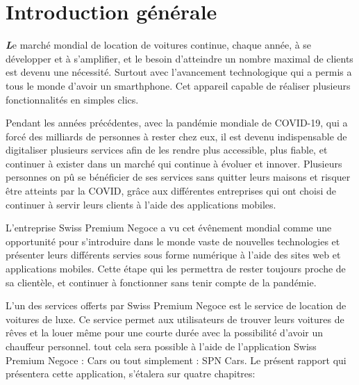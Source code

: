 \thispagestyle{plain}
\section{Introduction générale}
\vspace{1.5cm}
\setlength{\parindent}{40pt}
\justifying
\begin{small}
    \lettrine[findent=2pt]{\textbf{\textit{L}}}{}e marché mondial de location de voitures continue, chaque année, à se développer et à s'amplifier, et le besoin d'atteindre un nombre maximal de clients est devenu une nécessité. Surtout avec l'avancement technologique qui a permis a tous le monde d'avoir un smarthphone. Cet appareil capable de réaliser plusieurs fonctionnalités en simples clics.

    \noindent Pendant les années précédentes, avec la pandémie mondiale de COVID-19, qui a forcé des milliards de personnes à rester chez eux, il est devenu indispensable de digitaliser plusieurs services afin de les rendre plus accessible, plus fiable, et continuer à exister dans un marché qui continue à évoluer et innover. Plusieurs personnes on pû se bénéficier de ses services sans quitter leurs maisons et risquer être atteints par la COVID, grâce aux différentes entreprises qui ont choisi de continuer à servir leurs clients à l'aide des applications mobiles.

    \noindent L'entreprise Swiss Premium Negoce a vu cet évênement mondial comme une opportunité pour s'introduire dans le monde vaste de nouvelles technologies et présenter leurs différents servies sous forme numérique à l'aide des sites web et applications mobiles. Cette étape qui les permettra de rester toujours proche de sa clientèle, et continuer à fonctionner sans tenir compte de la pandémie.

    \noindent L'un des services offerts par Swiss Premium Negoce est le service de location de voitures de luxe. Ce service permet aux utilisateurs de trouver leurs voitures de rêves et la louer même pour une courte durée avec la possibilité d'avoir un chauffeur personnel. tout cela sera possible à l'aide de l'application Swiss Premium Negoce : Cars ou tout simplement : SPN Cars. Le présent rapport qui présentera cette application, s'étalera sur quatre chapitres:


\end{small}
